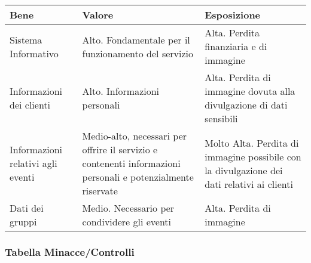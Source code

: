 \begin{tabular} {|P{4cm}|P{6cm}|P{7cm}|}
  \hline
  \textbf{Bene}                     & \textbf{Valore}                                                                                              & \textbf{Esposizione}      \\
  \hline
  Sistema Informativo               & Alto. Fondamentale per il funzionamento del servizio                                                         &
  Alta. Perdita finanziaria e di immagine                                                                                                                                      \\
  \hline
  Informazioni dei clienti          & Alto. Informazioni personali                                                                                 &
  Alta. Perdita di immagine dovuta alla divulgazione
  di dati sensibili                                                                                                                                                            \\
  \hline
  Informazioni relativi agli eventi & Medio-alto, necessari per offrire il servizio e contenenti informazioni personali e potenzialmente riservate &
  Molto Alta. Perdita di immagine possibile con la divulgazione dei dati relativi ai
  clienti                                                                                                                                                                      \\
  \hline
  Dati dei gruppi                   & Medio. Necessario per condividere gli eventi                                                                 & Alta. Perdita di immagine \\
  \hline
\end{tabular}

\subsubsection{Tabella Minacce/Controlli}

